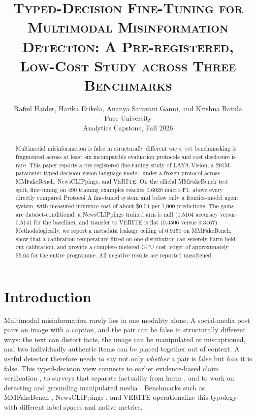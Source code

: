 \documentclass{article} %
\title{\textsc{Typed-Decision Fine-Tuning for Multimodal Misinformation Detection: A Pre-registered, Low-Cost Study across Three Benchmarks}}
\author{Rafiul Haider, Harika Etikela, Ananya Saravani Ganni, and Krishna Batula\\
Pace University\\
Analytics Capstone, Fall 2026
}
\begin{document}
\maketitle

\begin{abstract}
Multimodal misinformation is false in structurally different ways, yet benchmarking is fragmented across at least six incompatible evaluation protocols and cost disclosure is rare. This paper reports a pre-registered fine-tuning study of LAYA-Vision, a 201M-parameter typed-decision vision-language model, under a frozen protocol across MMFakeBench, NewsCLIPpings, and VERITE. On the official MMFakeBench test split, fine-tuning on 490 training examples reaches 0.6020 macro-F1, above every directly compared Protocol A fine-tuned system and below only a frontier-model agent system, with measured inference cost of about \$0.04 per 1,000 predictions. The gains are dataset-conditional: a NewsCLIPpings trained arm is null (0.5104 accuracy versus 0.5141 for the baseline), and transfer to VERITE is flat (0.3506 versus 0.3467). Methodologically, we report a metadata leakage ceiling of 0.9150 on MMFakeBench, show that a calibration temperature fitted on one distribution can severely harm held-out calibration, and provide a complete metered GPU cost ledger of approximately \$5.64 for the entire programme. All negative results are reported unsoftened.
\end{abstract}

\section{Introduction}
\label{sec:intro}
Multimodal misinformation rarely lies in one modality alone. A social-media post pairs an image with a caption, and the pair can be false in structurally different ways: the text can distort facts, the image can be manipulated or miscaptioned, and two individually authentic items can be placed together out of context. A useful detector therefore needs to say not only \emph{whether} a pair is false but \emph{how} it is false. This typed-decision view connects to earlier evidence-based claim verification \citep{Thorne2018FeverLargescale, Augenstein2019MultifcRealworld, Guo2021SurveyAutomated}, to surveys that separate factuality from harm \citep{Alam2021SurveyMultimodal}, and to work on detecting and grounding manipulated media \citep{Shao2023DetectingGrounding}. Benchmarks such as MMFakeBench \citep{Liu2024MmfakebenchMixedsource}, NewsCLIPpings \citep{Luo2021NewsclippingsAutomatic}, and VERITE \citep{Papadopoulos2023VeriteRobust} operationalize this typology with different label spaces and native metrics.
\end{document}
